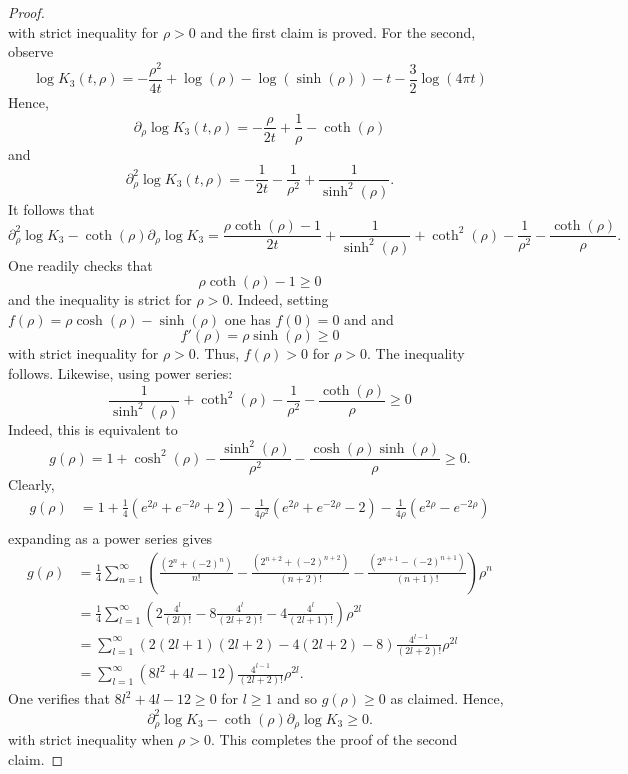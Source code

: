 \documentclass{amsart}
\theoremstyle{definition}
\theoremstyle{remark}
\numberwithin{equation}{section}
\begin{document}
\begin{proof}
$$	$$
	with strict inequality for $\rho>0$
	and the first claim is proved.  For the second, observe
	$$
	\log K_3(t,\rho)=- \frac{\rho^2}{4t}+\log(\rho)-\log(\sinh(\rho))-t-\frac{3}{2} \log(4\pi t)
	$$
    Hence,
    $$
    \partial_\rho \log K_3(t,\rho) =-\frac{\rho}{2t}+\frac{1}{\rho}-\coth(\rho)
    $$
    and
    $$
    \partial^2_\rho \log K_3(t,\rho)=- \frac{1}{2t} -\frac{1}{\rho^2} +\frac{1}{\sinh^2(\rho)}.
    $$
    It follows that
    $$
       \partial^2_\rho \log K_3-\coth(\rho)\partial_\rho \log K_3=\frac{ \rho \coth(\rho)-1}{2t} +\frac{1}{\sinh^2(\rho)}+\coth^2(\rho)-\frac{1}{\rho^2}-\frac{\coth(\rho)}{\rho}.
    $$   
    One readily checks that
    $$
    \rho \coth(\rho)-1\geq 0
    $$
    and the inequality is strict for $\rho>0$.
    Indeed, setting $f(\rho)=\rho \cosh(\rho)-\sinh(\rho)$ one has $f(0)=0$ and
    and
    $$
f'(\rho)=\rho \sinh(\rho)\geq 0
$$
with strict inequality for $\rho>0$.
Thus,  $f(\rho)> 0$ for $\rho> 0$. The inequality follows.
 Likewise, using power series:
    $$
    \frac{1}{\sinh^2(\rho)}+\coth^2(\rho)-\frac{1}{\rho^2}-\frac{\coth(\rho)}{\rho}\geq 0
    $$
    Indeed, 
    this is equivalent to
    $$
    g(\rho)= 1+\cosh^2(\rho)-\frac{\sinh^2(\rho)}{\rho^2}-\frac{\cosh(\rho)\sinh(\rho)}{\rho} \geq 0.
    $$
    Clearly, 
   \begin{align*}
    g(\rho)&=1 +\frac{1}{4}\left( e^{2\rho}+e^{-2\rho} +2\right) -\frac{1}{4\rho^2}\left( e^{2\rho}+e^{-2\rho} -2\right)-\frac{1}{4\rho} \left( e^{2\rho}-e^{-2\rho}\right)\\
    \end{align*}
    expanding as a power series gives
    \begin{align*}
    g(\rho)&= \frac{1}{4} \sum_{n=1}^\infty \left( \frac{(2^{n} +(-2)^n)}{n!}- \frac{(2^{n+2} +(-2)^{n+2})}{(n+2)!} -\frac{(2^{n+1}-(-2)^{n+1})}{(n+1)!}\right)\rho^{n}\\
    &=\frac{1}{4} \sum_{l=1}^\infty \left( 2\frac{4^{l}}{(2l)!} -8 \frac{4^{l}}{(2l+2)!}- 4\frac{4^{l}}{(2l+1)!}\right) \rho^{2l}\\
    &= \sum_{l=1}^\infty \left( 2 (2l+1)(2l+2) - 4(2l+2)-8\right) \frac{4^{l-1}}{(2l+2)!}\rho^{2l}\\     
    &=\sum_{l=1}^\infty \left(8l^2 + 4l-12\right) \frac{4^{l-1}}{(2l+2)!}\rho^{2l}.   
    \end{align*}
    One verifies that $8l^2+4l-12\geq 0$ for $l\geq 1$ and so $g(\rho) \geq 0$ as claimed.
    Hence,
    $$
     \partial^2_\rho \log K_3-\coth(\rho)\partial_\rho \log K_3\geq 0.
     $$
     with strict inequality when $\rho>0$.
     This completes the proof of the second claim.
\end{proof}
\end{document}
